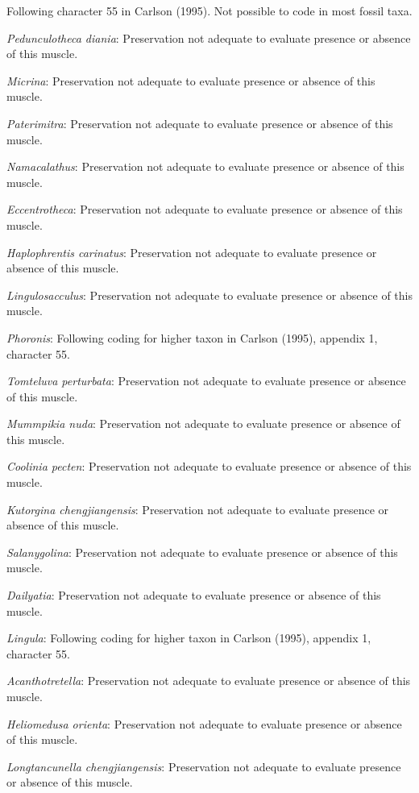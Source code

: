 \documentclass[]{book}
\theoremstyle{definition}
\theoremstyle{definition}
\theoremstyle{definition}
\theoremstyle{remark}
\begin{document}
Following character 55 in Carlson (1995). Not possible to code in most
fossil taxa.

\emph{Pedunculotheca diania}: Preservation not adequate to evaluate
presence or absence of this muscle.

\emph{Micrina}: Preservation not adequate to evaluate presence or
absence of this muscle.

\emph{Paterimitra}: Preservation not adequate to evaluate presence or
absence of this muscle.

\emph{Namacalathus}: Preservation not adequate to evaluate presence or
absence of this muscle.

\emph{Eccentrotheca}: Preservation not adequate to evaluate presence or
absence of this muscle.

\emph{Haplophrentis carinatus}: Preservation not adequate to evaluate
presence or absence of this muscle.

\emph{Lingulosacculus}: Preservation not adequate to evaluate presence
or absence of this muscle.

\emph{Phoronis}: Following coding for higher taxon in Carlson (1995),
appendix 1, character 55.

\emph{Tomteluva perturbata}: Preservation not adequate to evaluate
presence or absence of this muscle.

\emph{Mummpikia nuda}: Preservation not adequate to evaluate presence or
absence of this muscle.

\emph{Coolinia pecten}: Preservation not adequate to evaluate presence
or absence of this muscle.

\emph{Kutorgina chengjiangensis}: Preservation not adequate to evaluate
presence or absence of this muscle.

\emph{Salanygolina}: Preservation not adequate to evaluate presence or
absence of this muscle.

\emph{Dailyatia}: Preservation not adequate to evaluate presence or
absence of this muscle.

\emph{Lingula}: Following coding for higher taxon in Carlson (1995),
appendix 1, character 55.

\emph{Acanthotretella}: Preservation not adequate to evaluate presence
or absence of this muscle.

\emph{Heliomedusa orienta}: Preservation not adequate to evaluate
presence or absence of this muscle.

\emph{Longtancunella chengjiangensis}: Preservation not adequate to
evaluate presence or absence of this muscle.
\end{document}

